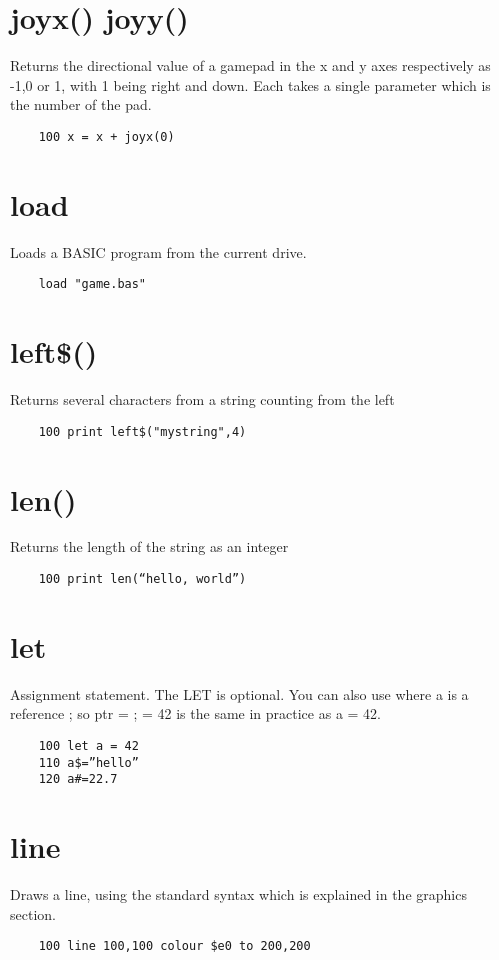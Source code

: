 \section*{joyx() joyy()}
Returns the directional value of a gamepad in the x and y axes respectively as -1,0 or 1, with 1 being right and down. Each takes a single parameter which is the number of the pad.
\example{}
\begin{verbatim}
	100 x = x + joyx(0)
\end{verbatim}

\section*{load}
Loads a BASIC program from the current drive.
\example{}
\begin{verbatim}
	load "game.bas"
\end{verbatim}

\section*{left\$()}
Returns several characters from a string counting from the left
\example{}
\begin{verbatim}
	100 print left$("mystring",4)
\end{verbatim}

\section*{len()}
Returns the length of the string as an integer
\example{}
\begin{verbatim}
	100 print len(“hello, world”)
\end{verbatim}

\section*{let}
Assignment statement. The LET is optional. You can also use \@a where a is a reference ; so ptr = \@a ; \@ptr = 42 is the same in practice as a = 42.
\example{}
\begin{verbatim}
	100 let a = 42
	110 a$=”hello”
	120 a#=22.7
\end{verbatim}

\section*{line}
Draws a line, using the standard syntax which is explained in the graphics section.
\example{}
\begin{verbatim}
	100 line 100,100 colour $e0 to 200,200
\end{verbatim}

